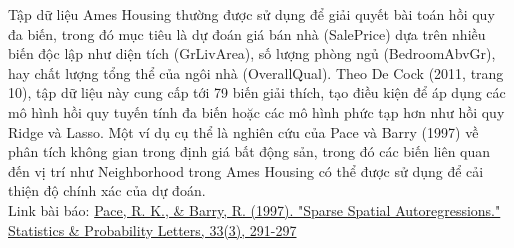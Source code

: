 Tập dữ liệu Ames Housing thường được sử dụng để giải quyết bài toán hồi quy đa biến, trong đó mục tiêu là dự đoán giá bán nhà (SalePrice) dựa trên nhiều biến độc lập như diện tích (GrLivArea), số lượng phòng ngủ (BedroomAbvGr), hay chất lượng tổng thể của ngôi nhà (OverallQual). Theo De Cock (2011, trang 10), tập dữ liệu này cung cấp tới 79 biến giải thích, tạo điều kiện để áp dụng các mô hình hồi quy tuyến tính đa biến hoặc các mô hình phức tạp hơn như hồi quy Ridge và Lasso. Một ví dụ cụ thể là nghiên cứu của Pace và Barry (1997) về phân tích không gian trong định giá bất động sản, trong đó các biến liên quan đến vị trí như Neighborhood trong Ames Housing có thể được sử dụng để cải thiện độ chính xác của dự đoán.\\
Link bài báo: \href{https://www.sciencedirect.com/science/article/abs/pii/S016771529600140X}{ Pace, R. K., \& Barry, R. (1997). "Sparse Spatial Autoregressions." Statistics \& Probability Letters, 33(3), 291-297}